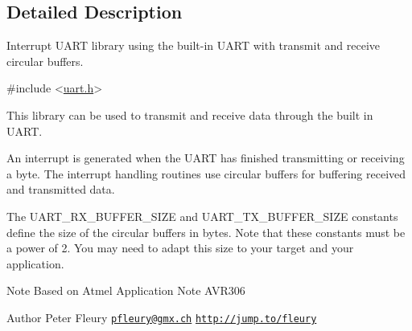\subsection{Detailed Description}
Interrupt U\-A\-R\-T library using the built-\/in U\-A\-R\-T with transmit and receive circular buffers. 
\begin{DoxyCode}
\textcolor{preprocessor}{#include <\hyperlink{uart_8h}{uart.h}>} 
\end{DoxyCode}


This library can be used to transmit and receive data through the built in U\-A\-R\-T.

An interrupt is generated when the U\-A\-R\-T has finished transmitting or receiving a byte. The interrupt handling routines use circular buffers for buffering received and transmitted data.

The U\-A\-R\-T\-\_\-\-R\-X\-\_\-\-B\-U\-F\-F\-E\-R\-\_\-\-S\-I\-Z\-E and U\-A\-R\-T\-\_\-\-T\-X\-\_\-\-B\-U\-F\-F\-E\-R\-\_\-\-S\-I\-Z\-E constants define the size of the circular buffers in bytes. Note that these constants must be a power of 2. You may need to adapt this size to your target and your application.

\begin{DoxyNote}{Note}
Based on Atmel Application Note A\-V\-R306 
\end{DoxyNote}
\begin{DoxyAuthor}{Author}
Peter Fleury \href{mailto:pfleury@gmx.ch}{\tt pfleury@gmx.\-ch} \href{http://jump.to/fleury}{\tt http\-://jump.\-to/fleury} 
\end{DoxyAuthor}


